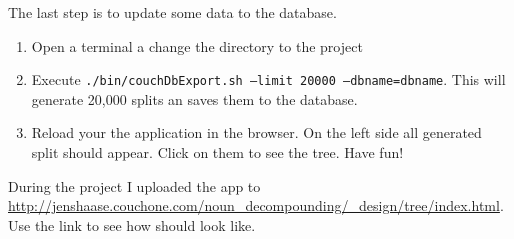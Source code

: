 \documentclass[11pt, accentcolor=tud9b, nochapname]{tudreport}
\begin{document}
The last step is to update some data to the database.

\begin{enumerate}
  \item Open a terminal a change the directory to the project
  \item Execute \texttt{./bin/couchDbExport.sh --limit 20000 --dbname=dbname}. This will generate 20,000 splits an saves them to the database.
  \item Reload your the application in the browser. On the left side all generated split should appear. Click on them to see the tree. Have fun!
\end{enumerate}

During the project I uploaded the app to \url{http://jenshaase.couchone.com/noun_decompounding/_design/tree/index.html}. Use the link to see how should look like.



\end{document}
